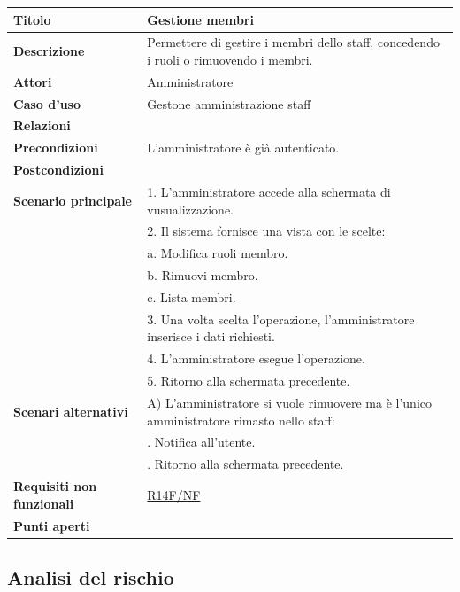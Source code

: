 \documentclass[a4paper]{article}
\begin{document}
\begin{center}
\begin{tabularx}{1\textwidth}{|l|X|}
    \hline
	\textbf{Titolo} & Gestione membri \\
	\hline
	\textbf{Descrizione} & Permettere di gestire i membri dello staff, concedendo i ruoli o rimuovendo i membri. \\
	\hline
	\textbf{Attori} & Amministratore \\
	\hline
	\textbf{Caso d'uso} & Gestone amministrazione staff \\
	\hline
	\textbf{Relazioni} &  \\
	\hline
	\textbf{Precondizioni} &  L'amministratore è già autenticato. \\
	\hline
	\textbf{Postcondizioni} &  \\
	\hline
	\textbf{Scenario principale} & 1. L'amministratore accede alla schermata di vusualizzazione. \\
								 & 2. Il sistema fornisce una vista con le scelte: \\
								 & \quad a. Modifica ruoli membro.\\
								 & \quad b. Rimuovi membro.\\
								 & \quad c. Lista membri.\\
								 & 3. Una volta scelta l'operazione, l'amministratore inserisce i dati richiesti. \\
								 & 4. L'amministratore esegue l'operazione.\\
								 & 5. Ritorno alla schermata precedente.\\
	\hline
	\textbf{Scenari alternativi} & A) L'amministratore si vuole rimuovere ma è l'unico amministratore rimasto nello staff: \\
								 & \quad 1. Notifica all'utente. \\
								 & \quad 2. Ritorno alla schermata precedente. \\
	\hline
	\textbf{Requisiti non funzionali} & \hyperlink{R14F/NF}{R14F/NF} \\
	\hline
	\textbf{Punti aperti} & \\
	\hline
\end{tabularx}
\end{center}


\newpage

\subsection{Analisi del rischio}
\end{document}
